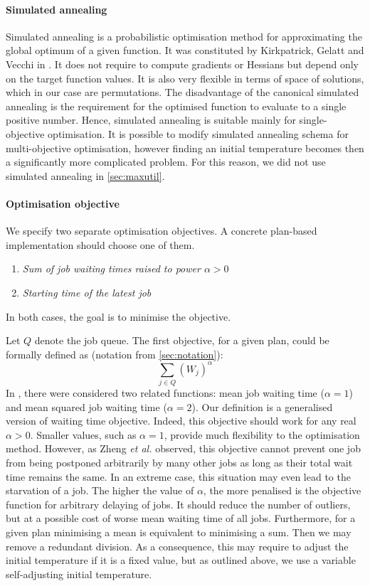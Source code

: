 \documentclass[thesis-en.tex]{subfiles}
\begin{document}
\paragraph{Simulated annealing}
Simulated annealing is a probabilistic optimisation method for approximating the global optimum of a given function. It was constituted by Kirkpatrick, Gelatt and Vecchi in \cite{10.2307/1690046}. It does not require to compute gradients or Hessians but depend only on the target function values. It is also very flexible in terms of space of solutions, which in our case are permutations. The disadvantage of the canonical simulated annealing is the requirement for the optimised function to evaluate to a single positive number. Hence, simulated annealing is suitable mainly for single-objective optimisation. It is possible to modify simulated annealing schema for multi-objective optimisation, however finding an initial temperature becomes then a significantly more complicated problem. For this reason, we did not use simulated annealing in \autoref{sec:maxutil}.

\paragraph{Optimisation objective}
We specify two separate optimisation objectives. A concrete plan-based implementation should choose one of them.
\begin{enumerate}
    \item \emph{Sum of job waiting times raised to power $\alpha > 0$}
    \item \emph{Starting time of the latest job}
\end{enumerate}
In both cases, the goal is to minimise the objective.

Let $Q$ denote the job queue. The first objective, for a given plan, could be formally defined as (notation from \autoref{sec:notation}):
\[ \sum_{j \in Q} (W_j)^\alpha \]
In \cite{zheng2016exploring}, there were considered two related functions: mean job waiting time ($\alpha = 1$) and mean squared job waiting time ($\alpha = 2$). Our definition is a generalised version of waiting time objective. Indeed, this objective should work for any real $\alpha > 0$. Smaller values, such as $\alpha = 1$, provide much flexibility to the optimisation method. However, as Zheng \textit{et al.} observed, this objective cannot prevent one job from being postponed arbitrarily by many other jobs as long as their total wait time remains the same. In an extreme case, this situation may even lead to the starvation of a job. The higher the value of $\alpha$, the more penalised is the objective function for arbitrary delaying of jobs. It should reduce the number of outliers, but at a possible cost of worse mean waiting time of all jobs.
Furthermore, for a given plan minimising a mean is equivalent to minimising a sum. Then we may remove a redundant division. As a consequence, this may require to adjust the initial temperature if it is a fixed value, but as outlined above, we use a variable self-adjusting initial temperature.
\end{document}
